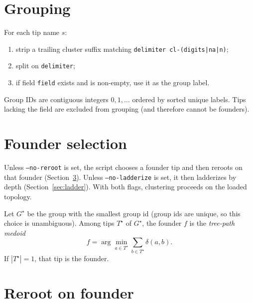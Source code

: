 \documentclass[11pt,a4paper]{article}
\begin{document}
\section{Grouping}
\label{sec:group}

For each tip name $s$:
\begin{enumerate}[nosep]
  \item strip a trailing cluster suffix matching
        \texttt{delimiter\,cl-(digits|na|n)};
  \item split on \texttt{delimiter};
  \item if field \texttt{field} exists and is non-empty, use it as the group label.
\end{enumerate}
Group IDs are contiguous integers $0,1,\ldots$ ordered by sorted unique labels.
Tips lacking the field are excluded from grouping (and therefore cannot be
founders).

\section{Founder selection}
\label{sec:founder}

Unless \texttt{--no-reroot} is set, the script chooses a founder tip and then
reroots on that founder (Section~\ref{sec:reroot}).
Unless \texttt{--no-ladderize} is set, it then ladderizes by depth
(Section~\ref{sec:ladder}).
With both flags, clustering proceeds on the loaded topology.

Let $G^\star$ be the group with the smallest group id
(group ids are unique, so this choice is unambiguous).
Among tips $T^\star$ of $G^\star$, the founder $f$ is the
\emph{tree-path medoid}
\begin{equation}
  f=\arg\min_{a\in T^\star}\sum_{b\in T^\star}\delta(a,b).
\end{equation}
If $|T^\star|=1$, that tip is the founder.

\section{Reroot on founder}
\label{sec:reroot}
\end{document}
